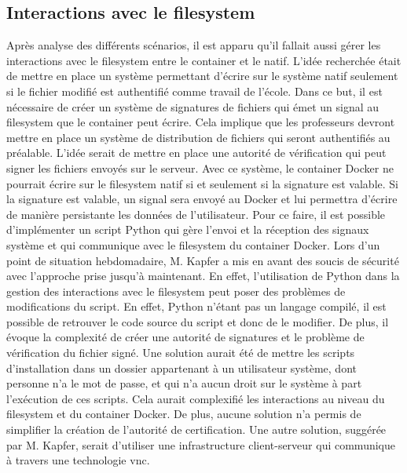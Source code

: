 \subsection{Interactions avec le filesystem}

Après analyse des différents scénarios, il est apparu qu'il fallait aussi gérer les interactions avec le \gls{filesystem} entre le container et le natif.
L'idée recherchée était de mettre en place un système permettant d'écrire sur le système natif seulement si le fichier modifié est authentifié comme travail de l'école.
Dans ce but, il est nécessaire de créer un système de signatures de fichiers qui émet un signal au \gls{filesystem} que le container peut écrire.
Cela implique que les professeurs devront mettre en place un système de distribution de fichiers qui seront authentifiés au préalable.
L'idée serait de mettre en place une autorité de vérification qui peut signer les fichiers envoyés sur le serveur.
Avec ce système, le container Docker ne pourrait écrire sur le \gls{filesystem} natif si et seulement si la signature est valable.
Si la signature est valable, un signal sera envoyé au Docker et lui permettra d'écrire de manière persistante les données de l'utilisateur.
Pour ce faire, il est possible d'implémenter un script Python qui gère l'envoi et la réception des signaux système et qui communique avec le \gls{filesystem} du container Docker.
\newline
Lors d'un point de situation hebdomadaire, M. Kapfer a mis en avant des soucis de sécurité avec l'approche prise jusqu'à maintenant.
En effet, l'utilisation de Python dans la gestion des interactions avec le \gls{filesystem} peut poser des problèmes de modifications du script.
En effet, Python n'étant pas un langage compilé, il est possible de retrouver le code source du script et donc de le modifier.
De plus, il évoque la complexité de créer une autorité de signatures et le problème de vérification du fichier signé.
\newline
Une solution aurait été de mettre les scripts d'installation dans un dossier appartenant à un utilisateur système, dont personne n'a le mot de passe, et qui n'a aucun droit sur le système à part l'exécution de ces scripts.
Cela aurait complexifié les interactions au niveau du \gls{filesystem} et du container Docker.
De plus, aucune solution n'a permis de simplifier la création de l'autorité de certification.
\newline
Une autre solution, suggérée par M. Kapfer, serait d'utiliser une infrastructure client-serveur qui communique à travers une technologie \acrshort{vnc}.
